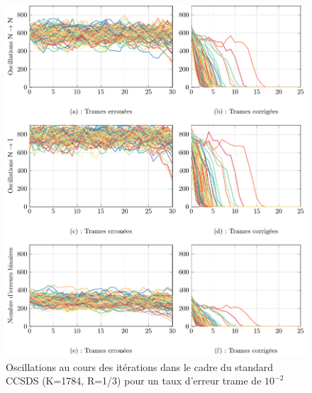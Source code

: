 \begin{figure}[!ht]
	\begin{center}
	\includegraphics[width=.9\textwidth]{main/ch2_fig/tikz/it_ccsds10-2.pdf}
	\caption{Oscillations au cours des itérations dans le cadre du standard CCSDS (K=1784, R=1/3) pour un taux d'erreur trame de $10^{-2}$\label{fig:it1_ccsds}}
	\end{center}
\end{figure}

